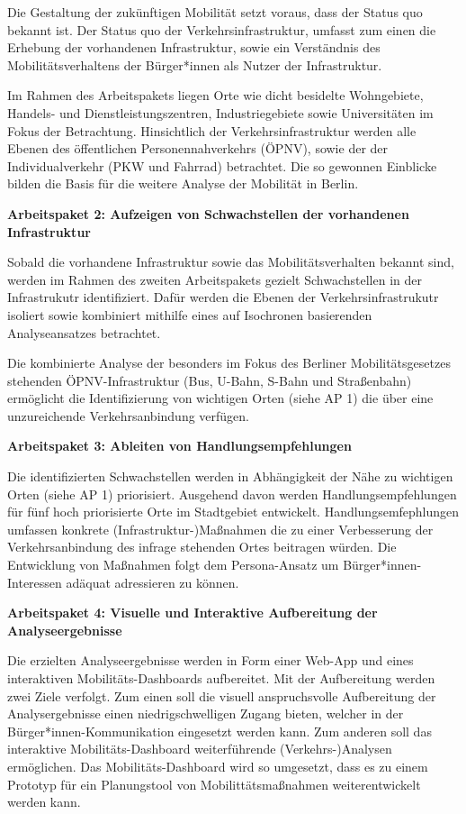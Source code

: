 Die Gestaltung der zukünftigen Mobilität setzt voraus, dass der Status quo bekannt ist. Der Status quo der Verkehrsinfrastruktur, umfasst zum einen die Erhebung der vorhandenen Infrastruktur, sowie ein Verständnis des Mobilitätsverhaltens der Bürger*innen als Nutzer der Infrastruktur.

Im Rahmen des Arbeitspakets liegen Orte wie dicht besidelte Wohngebiete, Handels- und Dienstleistungszentren, Industriegebiete sowie Universitäten im Fokus der Betrachtung. Hinsichtlich der Verkehrsinfrastruktur werden alle Ebenen des öffentlichen Personennahverkehrs (ÖPNV), sowie der der Individualverkehr (PKW und Fahrrad) betrachtet. Die so gewonnen Einblicke bilden die Basis für die weitere Analyse der Mobilität in Berlin.

\textbf{Arbeitspaket 2: Aufzeigen von Schwachstellen der vorhandenen Infrastruktur}

Sobald die vorhandene Infrastruktur sowie das Mobilitätsverhalten bekannt sind, werden im Rahmen des zweiten Arbeitspakets gezielt Schwachstellen in der Infrastrukutr identifiziert. Dafür werden die  Ebenen der Verkehrsinfrastrukutr isoliert sowie kombiniert mithilfe eines auf Isochronen basierenden Analyseansatzes betrachtet. 

Die kombinierte Analyse der besonders im Fokus des Berliner Mobilitätsgesetzes stehenden ÖPNV-Infrastruktur (Bus, U-Bahn, S-Bahn und Straßenbahn) ermöglicht die Identifizierung von wichtigen Orten (siehe AP 1) die über eine unzureichende Verkehrsanbindung verfügen.

\textbf{Arbeitspaket 3: Ableiten von Handlungsempfehlungen}

Die identifizierten Schwachstellen werden in Abhängigkeit der Nähe zu wichtigen Orten (siehe AP 1) priorisiert. Ausgehend davon werden Handlungsempfehlungen für fünf hoch priorisierte Orte im Stadtgebiet entwickelt. Handlungsemfephlungen umfassen konkrete (Infrastruktur-)Maßnahmen die zu einer Verbesserung der Verkehrsanbindung des infrage stehenden Ortes beitragen würden. Die Entwicklung von Maßnahmen folgt dem Persona-Ansatz um Bürger*innen-Interessen adäquat adressieren zu können.

\textbf{Arbeitspaket 4: Visuelle und Interaktive Aufbereitung der Analyseergebnisse}

Die erzielten Analyseergebnisse werden in Form einer Web-App und eines interaktiven Mobilitäts-Dashboards aufbereitet. Mit der Aufbereitung werden zwei Ziele verfolgt. Zum einen soll die visuell anspruchsvolle Aufbereitung der Analysergebnisse einen niedrigschwelligen Zugang bieten, welcher in der Bürger*innen-Kommunikation eingesetzt werden kann. Zum anderen soll das interaktive Mobilitäts-Dashboard weiterführende (Verkehrs-)Analysen ermöglichen. Das Mobilitäts-Dashboard wird so umgesetzt, dass es zu einem Prototyp für ein Planungstool von Mobilittätsmaßnahmen weiterentwickelt werden kann.

